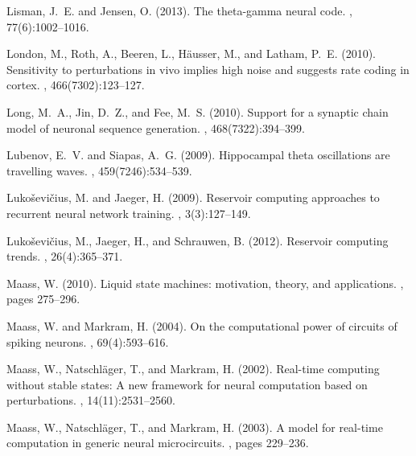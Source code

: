 \documentclass[11pt]{article} %
\begin{document}
\begin{thebibliography}{10}
Lisman, J.~E. and Jensen, O. (2013).
\newblock The theta-gamma neural code.
, 77(6):1002--1016.

London, M., Roth, A., Beeren, L., H{\"a}usser, M., and Latham, P.~E. (2010).
\newblock Sensitivity to perturbations in vivo implies high noise and suggests
  rate coding in cortex.
, 466(7302):123--127.

Long, M.~A., Jin, D.~Z., and Fee, M.~S. (2010).
\newblock Support for a synaptic chain model of neuronal sequence generation.
, 468(7322):394--399.

Lubenov, E.~V. and Siapas, A.~G. (2009).
\newblock Hippocampal theta oscillations are travelling waves.
, 459(7246):534--539.

Luko{\v{s}}evi{\v{c}}ius, M. and Jaeger, H. (2009).
\newblock Reservoir computing approaches to recurrent neural network training.
, 3(3):127--149.

Luko{\v{s}}evi{\v{c}}ius, M., Jaeger, H., and Schrauwen, B. (2012).
\newblock Reservoir computing trends.
, 26(4):365--371.

Maass, W. (2010).
\newblock Liquid state machines: motivation, theory, and applications.
, pages 275--296.

Maass, W. and Markram, H. (2004).
\newblock On the computational power of circuits of spiking neurons.
, 69(4):593--616.

Maass, W., Natschl{\"a}ger, T., and Markram, H. (2002).
\newblock Real-time computing without stable states: A new framework for neural
  computation based on perturbations.
, 14(11):2531--2560.

Maass, W., Natschl{\"a}ger, T., and Markram, H. (2003).
\newblock A model for real-time computation in generic neural microcircuits.
, pages
  229--236.


\end{thebibliography}
\end{document}
